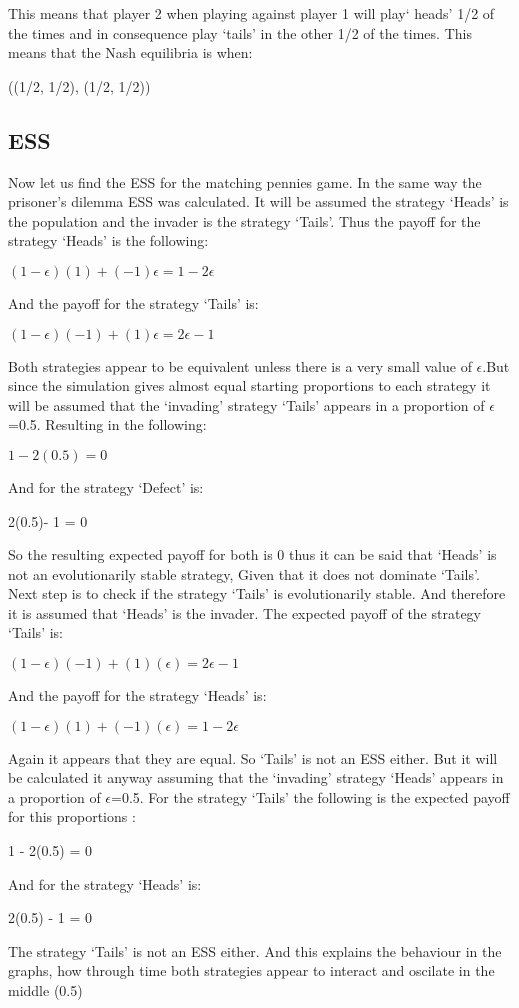 This means that player 2 when playing against player 1 will play` heads'  1/2  of the times and in consequence play `tails' in the other 1/2 of the times. 
This means that the Nash equilibria is when:
\begin{center}
((1/2, 1/2), (1/2, 1/2))
\end{center}

\subsection{ESS}
Now let us find the ESS for the matching pennies game. In the same way the prisoner's dilemma ESS was calculated. It will be assumed the strategy  `Heads' is the population and the invader is the strategy `Tails'. Thus the payoff for the strategy `Heads' is the following:
\begin{center}
$(1-{\epsilon})(1) + (-1){\epsilon} = 1 - 2{\epsilon}$
\end{center}
And the payoff for the strategy `Tails' is:
\begin{center}
$(1-{\epsilon})(-1) + (1){\epsilon} = 2{\epsilon} - 1$
\end{center}
Both strategies appear to be equivalent unless there is a very small value of $\epsilon$.But since the simulation gives almost equal starting proportions to each strategy it will be assumed that the `invading' strategy `Tails' appears in a proportion of $\epsilon$=0.5. Resulting in the following:
\begin{center}
$1- 2(0.5) = 0$
\end{center}
And for the strategy `Defect' is:
\begin{center}
 2(0.5)- 1 = 0
\end{center}
So the resulting expected payoff for both is 0 thus it can be said that `Heads' is not an evolutionarily stable strategy, Given that it does not dominate `Tails'.
Next step is to check if the strategy `Tails' is evolutionarily stable. And therefore it is assumed that `Heads' is the invader. The expected payoff of the strategy `Tails' is:
\begin{center}
$(1-{\epsilon})(-1) + (1)({\epsilon}) = 2{\epsilon} -1$
\end{center}
And the payoff for the strategy `Heads' is:
\begin{center}
$(1-{\epsilon})(1) + (-1)({\epsilon}) =  1 - 2{\epsilon}$
\end{center}
Again it appears that they are equal. So `Tails' is not an ESS either. But it will be calculated it anyway assuming that the `invading' strategy `Heads' appears in a proportion of $\epsilon$=0.5. For the strategy `Tails' the following is the expected payoff for this proportions :
\begin{center}
1 -  2(0.5) = 0
\end{center}
And for the strategy `Heads' is:
\begin{center}
 2(0.5) - 1 = 0
\end{center}
The strategy `Tails' is not an ESS either. And this explains the behaviour in the graphs, how through time both strategies appear to interact and oscilate in the middle (0.5)



